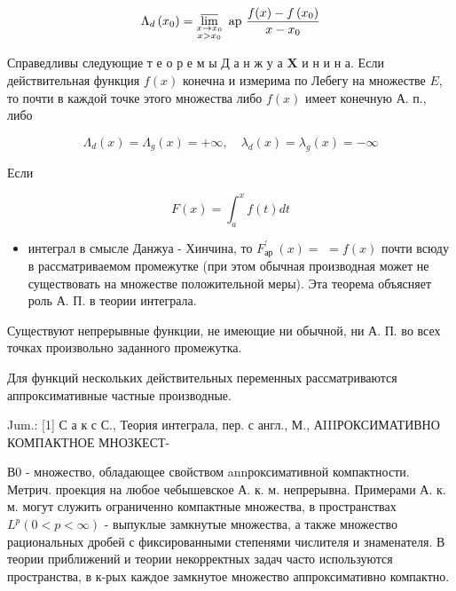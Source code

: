 \documentclass[10pt]{article}
\begin{document}
\[

\Lambda_{d}\left(x_{0}\right)=\varlimsup_{\substack{x \rightarrow x_{0} \\ x>x_{0}}} \text { ap } \frac{f(x)-f\left(x_{0}\right)}{x-x_{0}}

\]



Справедливы следующие т е о р е м ы Д а н ж у а $\mathbf{X}$ и н и н а. Если действительная функция $f(x)$ конечна и измерима по Лебегу на множестве $E$, то почти в каждой точке этого множества либо $f(x)$ имеет конечную А. п., либо



\[

\Lambda_{d}(x)=\Lambda_{g}(x)=+\infty, \quad \lambda_{d}(x)=\lambda_{g}(x)=-\infty

\]



Если



\[

F(x)=\int_{a}^{x} f(t) d t

\]



\begin{itemize}

  \item интеграл в смысле Данжуа - Хинчина, то $F_{\text {ар }}^{\prime}(x)=$ $=f(x)$ почти всюду в рассматриваемом промежутке (при этом обычная производная может не существовать на множестве положительной меры). Эта теорема объясняет роль А. П. в теории интеграла.

\end{itemize}



Существуют непрерывные функции, не имеющие ни обычной, ни А. П. во всех точках произвольно заданного промежутка.



Для функций нескольких действительных переменных рассматриваются аппроксимативные частные производные.



Jum.: [1] С а к с С., Теория интеграла, пер. с англ., М., АIIIРОКСИМАТИВНО КОМПАКТНОЕ МНОЗКЕСТ-



В0 - множество, обладающее свойством annроксимативной компактности. Метрич. проекция на любое чебышевское А. к. м. непрерывна. Примерами А. к. м. могут служить ограниченно компактные множества, в пространствах $L^{p}(0<p<\infty)$ - выпуклые замкнутые множества, а также множество рациональных дробей с фиксированными степенями числителя и знаменателя. В теории приближений и теории некорректных задач часто используются пространства, в к-рых каждое замкнутое множество аппроксимативно компактно.
\end{document}
